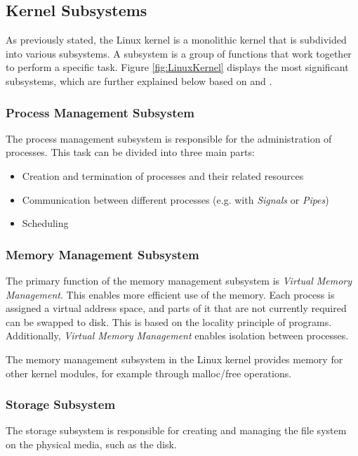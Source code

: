 \subsection{Kernel Subsystems}

As previously stated, the Linux kernel is a monolithic kernel that is subdivided into various subsystems. A subsystem is a group of functions that work together to perform a specific task. Figure \ref{fig:LinuxKernel} displays the most significant subsystems, which are further explained below based on \cite{like03} and \cite{like09}.

\subsubsection{Process Management Subsystem}
The process management subsystem is responsible for the administration of processes. This task can be divided into three main parts:

\begin{itemize}
\item Creation and termination of processes and their related resources
\item Communication between different processes (e.g. with \textit{Signals} or \textit{Pipes})
\item Scheduling
\end{itemize}

\subsubsection{Memory Management Subsystem}
The primary function of the memory management subsystem is \textit{Virtual Memory Management}. This enables more efficient use of the memory. Each process is assigned a virtual address space, and parts of it that are not currently required can be swapped to disk. This is based on the locality principle of programs. Additionally, \textit{Virtual Memory Management} enables isolation between processes.

The memory management subsystem in the Linux kernel provides memory for other kernel modules, for example through malloc/free operations.

\subsubsection{Storage Subsystem}
The storage subsystem is responsible for creating and managing the file system on the physical media, such as the disk.


